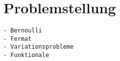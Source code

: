 %
%
%
\section{Problemstellung
\label{buch:variation:section:problemstellung}}

\begin{verbatim}
- Bernoulli
- Fermat
- Variationsprobleme
- Funktionale
\end{verbatim}
